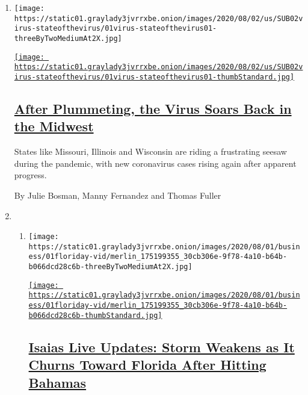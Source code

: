 \begin{enumerate}
\def\labelenumi{\arabic{enumi}.}
\item
  \texttt{[image: https://static01.graylady3jvrrxbe.onion/images/2020/08/02/us/SUB02virus-stateofthevirus/01virus-stateofthevirus01-threeByTwoMediumAt2X.jpg]}

  \href{/2020/08/01/us/coronavirus-midwest-cases-deaths.html}{\texttt{[image: https://static01.graylady3jvrrxbe.onion/images/2020/08/02/us/SUB02virus-stateofthevirus/01virus-stateofthevirus01-thumbStandard.jpg]}}

  \hypertarget{after-plummeting-the-virus-soars-back-in-the-midwest}{%
  \subsection{\texorpdfstring{\href{/2020/08/01/us/coronavirus-midwest-cases-deaths.html}{After
  Plummeting, the Virus Soars Back in the
  Midwest}}{After Plummeting, the Virus Soars Back in the Midwest}}\label{after-plummeting-the-virus-soars-back-in-the-midwest}}

  States like Missouri, Illinois and Wisconsin are riding a frustrating
  seesaw during the pandemic, with new coronavirus cases rising again
  after apparent progress.

  By Julie Bosman, Manny Fernandez and Thomas Fuller
\item
  \begin{enumerate}
  \def\labelenumii{\arabic{enumii}.}
  \item
    \texttt{[image: https://static01.graylady3jvrrxbe.onion/images/2020/08/01/business/01floriday-vid/merlin\_175199355\_30cb306e-9f78-4a10-b64b-b066dcd28c6b-threeByTwoMediumAt2X.jpg]}

    \href{/2020/08/01/us/hurricane-isaias-track.html}{\texttt{[image: https://static01.graylady3jvrrxbe.onion/images/2020/08/01/business/01floriday-vid/merlin\_175199355\_30cb306e-9f78-4a10-b64b-b066dcd28c6b-thumbStandard.jpg]}}

    \hypertarget{isaias-live-updates-storm-weakens-as-it-churns-toward-florida-after-hitting-bahamas}{%
    \subsection{\texorpdfstring{\href{/2020/08/01/us/hurricane-isaias-track.html}{Isaias
    Live Updates: Storm Weakens as It Churns Toward Florida After
    Hitting
    Bahamas}}{Isaias Live Updates: Storm Weakens as It Churns Toward Florida After Hitting Bahamas}}\label{isaias-live-updates-storm-weakens-as-it-churns-toward-florida-after-hitting-bahamas}}


\end{enumerate}
\end{enumerate}
